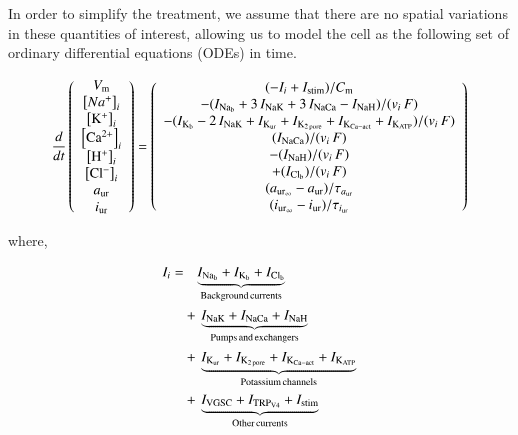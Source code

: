 In order to simplify the treatment, we assume that there are no
spatial variations in these quantities of interest, allowing us to
model the cell as the following set of ordinary differential equations
(ODEs) in time.

\begin{equation}
  \frac{d}{dt}
  \left(
    \begin{array}{c}
      V_{\rm m}\\
      \left[Na^{+}\right]_{i}\\
      \left[\rm K^{+}\right]_{i}\\
      \left[\rm Ca^{2+}\right]_{i}\\
      \left[\rm H^{+}\right]_{i}\\
      \left[\rm Cl^{-}\right]_{i}\\
      a_{\rm ur}\\
      i_{\rm ur}\\
    \end{array}
  \right)  = \left(
    \begin{array}{c}
        (-I_{i} + I_{\rm stim})/{C_{\rm m}}\\
      - (I_{\rm Na_{b}} + 3\, I_{\rm NaK} + 3\, I_{\rm NaCa} - I_{\rm
        NaH})/(v_{i}\, F)\\
      - (I_{\rm K_{b}} - 2\, I_{\rm NaK} + I_{\rm K_{ur}} + I_{\rm
        K_{2\, pore}} + I_{\rm K_{Ca-act}} + I_{\rm K_{ATP}})/(v_{i}\,
      F)\\
        (I_{\rm NaCa})/(v_{i}\, F)\\
      - (I_{\rm NaH})/(v_{i}\, F)\\
      + (I_{\rm Cl_{b}})/(v_{i}\, F)\\
      (a_{{\rm ur}_{\infty}} - a_{\rm ur})/\tau_{a_{\rm ur}}\\
      (i_{{\rm ur}_{\infty}} - i_{\rm ur})/\tau_{i_{\rm ur}}\\
    \end{array}
  \right)
\end{equation}

\noindent where,

\begin{displaymath}
    \begin{split}
      I_{i} =
      & \phantom{+\,} \underbrace{I_{\rm Na_b} + I_{\rm K_b} + I_{\rm Cl_b}}_{\rm
        Background\, currents}\\
      & +\, \underbrace{I_{\rm NaK} + I_{\rm NaCa} + I_{\rm NaH}}_{\rm
        Pumps\, and\, exchangers}\\
      & +\, \underbrace{I_{\rm K_{ur}} + I_{\rm K_{2\, pore}} + I_{\rm
          K_{Ca-act}} + I_{\rm K_{ATP}}}_{\rm Potassium\, channels}\\
      & +\, \underbrace{I_{\rm VGSC} + I_{\rm TRP_{V4}} + I_{\rm
          stim}}_{\rm Other\, currents}
    \end{split}
\end{displaymath}

